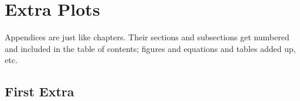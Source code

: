 \begin{savequote}[8cm]
\end{savequote}

\chapter{\label{app:1-cardiophys}Extra Plots}

\minitoc

Appendices are just like chapters.  Their sections and subsections get numbered and included in the table of contents; figures and equations and tables added up, etc.  

\section{First Extra}
\label{sec:FirstApp}

